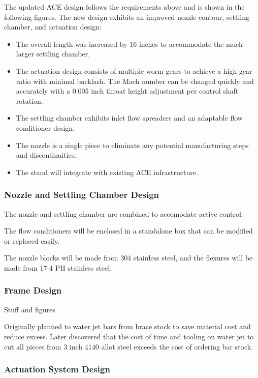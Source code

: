 The updated ACE design follows the requirements above and is shown in the following figures. The new design exhibits an improved nozzle contour, settling chamber, and actuation design:
\begin{itemize}
    \item The overall length was increased by 16 inches to accommodate the much larger settling chamber.
    \item The actuation design consists of multiple worm gears to achieve a high gear ratio with minimal backlash. The Mach number can be changed quickly and accurately with a 0.005 inch throat height adjustment per control shaft rotation.
    \item The settling chamber exhibits inlet flow spreaders and an adaptable flow conditioner design.
    \item The nozzle is a single piece to eliminate any potential manufacturing steps and discontinuities.
    \item The stand will integrate with existing ACE infrastructure.
\end{itemize}

\subsubsection{Nozzle and Settling Chamber Design}

The nozzle and settling chamber are combined to accomodate active control.

The flow conditioners will be enclosed in a standalone box that can be modified or replaced easily.

The nozzle blocks will be made from 304 stainless steel, and the flexures will be made from 17-4 PH stainless steel.

\subsubsection{Frame Design}

Stuff and figures

Originally planned to water jet bars from brace stock to save material cost and reduce excess. Later discovered that the cost of time and tooling on water jet to cut all pieces from 3 inch 4140 allot steel exceeds the cost of ordering bar stock.

\subsubsection{Actuation System Design}

